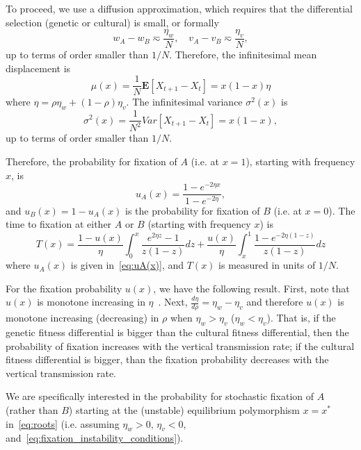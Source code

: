 \documentclass[14pt]{extarticle}
\newcommand{\E}{\mathbf{E}}
\begin{document}
To proceed, we use a diffusion approximation, which requires that the differential selection (genetic or cultural) is small, or formally~\citep{Karlin1974a}
\begin{equation}
w_A - w_B \eqsim \frac{\eta_w}{N}, \quad v_A - v_B \eqsim \frac{\eta_v}{N},
\end{equation}
up to terms of order smaller than $1/N$.
Therefore, the infinitesimal mean displacement is
\begin{equation}
\mu(x)=\frac{1}{N}\E[X_{t+1}-X_t]=x(1-x) \eta
\end{equation}
where $\eta = \rho \eta_w + (1-\rho) \eta_v$.
The infinitesimal variance $\sigma^2(x)$ is
\begin{equation}
\sigma^2(x)=\frac{1}{N^2}Var[X_{t+1}-X_t]=x(1-x),
\end{equation}
up to terms of order smaller than $1/N$.

Therefore, the probability for fixation of $A$ (i.e. at $x=1$), starting with frequency $x$, is
\begin{equation} \label{eq:uA(x)}
u_A(x) = \frac{1-e^{-2 \eta x}}{1-e^{-2\eta}},
\end{equation}
and $u_B(x) = 1-u_A(x)$ is the probability for fixation of $B$ (i.e. at $x=0$).
The time to fixation at either $A$ or $B$ (starting with frequency $x$) is 
\begin{equation} \label{eq:T(x)}
T(x) = 
\frac{1-u(x)}{\eta} \int_0^x{\frac{e^{2 \eta z} - 1}{z(1-z)} dz} + 
\frac{u(x)}{\eta} \int_x^1{\frac{1-e^{-2 \eta (1-z)}}{z(1-z)} dz}
\end{equation}
where $u_A(x)$ is given in~\eqref{eq:uA(x)}, and $T(x)$ is measured in units of $1/N$.

For the fixation probability $u(x)$, we have the following result.
First, note that $u(x)$ is monotone increasing in $\eta$~\cite[see][Appendix E]{Ram2018}. 
Next, $\frac{d\eta}{d\rho} = \eta_w - \eta_v$ and therefore $u(x)$ is monotone increasing (decreasing) in $\rho$ when $\eta_w > \eta_v$ ($\eta_w < \eta_v$). 
That is, if the genetic fitness differential is bigger than the cultural fitness differential, then the probability of fixation increases with the vertical transmission rate; if the cultural fitness differential is bigger, than the fixation probability decreases with the vertical transmission rate.


We are specifically interested in the probability for stochastic fixation of $A$ (rather than $B$) starting at the (unstable) equilibrium polymorphism $x=x^*$ in~\eqref{eq:roots} (i.e. assuming $\eta_w>0$, $\eta_v<0$, and~\eqref{eq:fixation_instability_conditions}).
\end{document}
